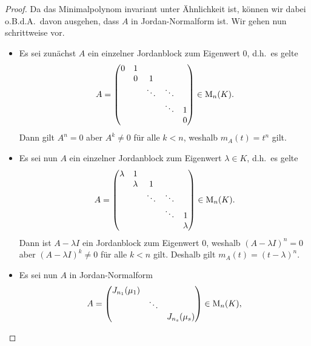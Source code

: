 \documentclass[a4paper,10pt]{scrartcl}
\begin{document}
\begin{proof}
  Da das Minimalpolynom invariant unter Ähnlichkeit ist, können wir dabei o.B.d.A.\ davon ausgehen, dass $A$ in Jordan-Normalform ist.
  Wir gehen nun schrittweise vor.
  \begin{itemize}
    \item
      Es sei zunächst $A$ ein einzelner Jordanblock zum Eigenwert $0$, d.h.\ es gelte
      \[
          A
        = \begin{pmatrix}
            0 & 1 &         &         &   \\
              & 0 & 1       &         &   \\
              &   & \ddots  & \ddots  &   \\
              &   &         & \ddots  & 1 \\
              &   &         &         & 0
          \end{pmatrix}
        \in \operatorname{M}_{n}(K).
      \]
      Dann gilt $A^n = 0$ aber $A^k \neq 0$ für alle $k < n$, weshalb $m_A(t) = t^n$ gilt.
    \item
      Es sei nun $A$ ein einzelner Jordanblock zum Eigenwert $\lambda \in K$, d.h.\ es gelte
      \[
          A
        = \begin{pmatrix}
            \lambda & 1       &         &         &         \\
                    & \lambda & 1       &         &         \\
                    &         & \ddots  & \ddots  &         \\
                    &         &         & \ddots  & 1       \\
                    &         &         &         & \lambda
          \end{pmatrix}
        \in \operatorname{M}_{n}(K).
      \]
      Dann ist $A - \lambda I$ ein Jordanblock zum Eigenwert $0$, weshalb $(A - \lambda I)^n = 0$ aber $(A - \lambda I)^k \neq 0$ für alle $k < n$ gilt.
      Deshalb gilt $m_A(t) = (t - \lambda)^n$.
    \item
      Es sei nun $A$ in Jordan-Normalform
      \[
          A
        = \begin{pmatrix}
            J_{n_1}(\mu_1)  &         &                 \\
                            & \ddots  &                 \\
                            &         & J_{n_s}(\mu_s)
          \end{pmatrix}
        \in \operatorname{M}_{n}(K),
\]
\end{itemize}
\end{proof}
\end{document}
